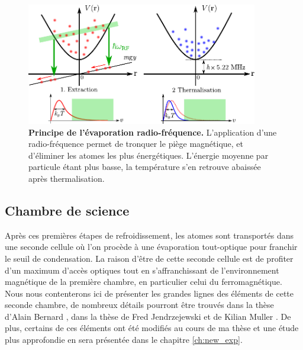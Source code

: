 \begin{figure}
\centering
\includegraphics[width=0.9\textwidth]{Fig/BEC_manip/evapRF.pdf}
\caption{\textbf{Principe de l'évaporation radio-fréquence.} L'application d'une radio-fréquence permet de tronquer le piège magnétique, et d'éliminer les atomes les plus énergétiques. L'énergie moyenne par particule étant plus basse, la température s'en retrouve abaissée après thermalisation.}
\label{fig:evapRF}
\end{figure}


\subsection{Chambre de science}
\label{sc:chambre_science}
Après ces premières étapes de refroidissement, les atomes sont transportés dans une seconde cellule où l'on procède à une évaporation tout-optique pour franchir le seuil de condensation. La raison d'être de cette seconde cellule est de profiter d'un maximum d'accès optiques tout en s'affranchissant de l'environnement magnétique de la première chambre, en particulier celui du ferromagnétique.
Nous nous contenterons ici de présenter les grandes lignes des éléments de cette seconde chambre, de nombreux détails pourront être trouvés dans la thèse d'Alain Bernard \citep{bernard2010transport}, dans la thèse de Fred Jendrzejewski \citep{jendrzejewski2012quantum} et de Kilian Muller \citep{muller2015coherent}. De plus, certains de ces éléments ont été modifiés au cours de ma thèse et une étude plus approfondie en sera présentée dans le chapitre \ref{ch:new_exp}.


